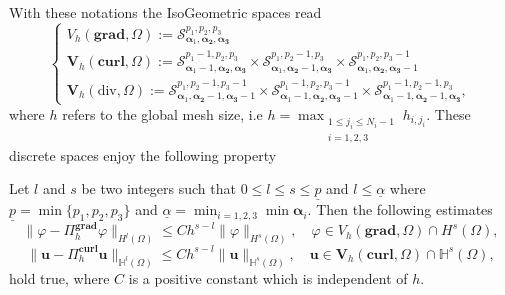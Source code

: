 With these notations the IsoGeometric spaces read \cite{buffa2011isogeometric,da2014mathematical}
\begin{equation}\label{eq:IsoGeometric-spaces}
\begin{cases}
V_h(\textbf{grad},\Omega):=\bm{\mathcal{S}}^{p_1,p_2,p_3}_{\bm{\alpha}_1,\bm{\alpha_2},\bm{\alpha_3}}\\
\bm{V}_h(\textbf{curl},\Omega):=\bm{\mathcal{S}}^{p_1-1,p_2,p_3}_{\bm{\alpha}_1-1,\bm{\alpha_2},\bm{\alpha_3}} \times \bm{\mathcal{S}}^{p_1,p_2-1,p_3}_{\bm{\alpha}_1,\bm{\alpha_2}-1,\bm{\alpha_3}} \times \bm{\mathcal{S}}^{p_1,p_2,p_3-1}_{\bm{\alpha}_1,\bm{\alpha_2},\bm{\alpha_3}-1}\\
\bm{V}_h(\text{div},\Omega):=\bm{\mathcal{S}}^{p_1,p_2-1,p_3-1}_{\bm{\alpha}_1,\bm{\alpha_2}-1,\bm{\alpha_3}-1} \times \bm{\mathcal{S}}^{p_1-1,p_2,p_3-1}_{\bm{\alpha}_1-1,\bm{\alpha_2},\bm{\alpha_3}-1} \times \bm{\mathcal{S}}^{p_1-1,p_2-1,p_3}_{\bm{\alpha}_1-1,\bm{\alpha_2}-1,\bm{\alpha_3}},
\end{cases}
\end{equation}
where $h$ refers to the global mesh size, i.e $h=\max_{\substack{1 \leq j_i \leq N_i-1 \\ i=1,2,3}}h_{i,j_i}$. These discrete spaces enjoy the following property 
\begin{theorem}{\cite[Theorem 5.3]{buffa2011isogeometric}}
Let $l$ and $s$ be two integers such that $0\leq l \leq s \leq \underline{p}$ and $l \leq \underline{\alpha}$ where $\underline{p}=\min\{p_1,p_2,p_3\}$ and $\underline{\alpha}=\min_{i=1,2,3} \min \bm{\alpha}_i$. Then the following estimates
\begin{equation*}
\|\varphi - \Pi_h^{\textbf{grad}}\varphi\|_{H^l(\Omega)} \leq C h^{s-l}\|\varphi\|_{H^s(\Omega)}, \quad \varphi \in V_h(\textbf{grad},\Omega) \cap H^s(\Omega),
\end{equation*}
\begin{equation*}
\|\bm{u} - \Pi_h^{\textbf{curl}}\bm{u}\|_{\mathbb{H}^l(\Omega)} \leq C h^{s-l}\|\bm{u}\|_{\mathbb{H}^s(\Omega)}, \quad \bm{u} \in \bm{V}_h(\textbf{curl},\Omega) \cap \mathbb{H}^s(\Omega),
\end{equation*}
hold true, where $C$ is a positive constant which is independent   of $h$.
\end{theorem}

